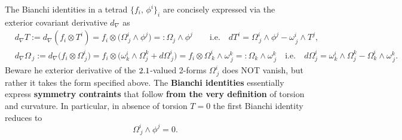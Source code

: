 \begin{mytheorem}
%
The Bianchi identities in a tetrad $\{f_i,\,\phi^i\}_i$ are concisely expressed via the exterior covariant derivative $d_\nabla$ as
{\small\begin{align}
    &d_\nabla T:=d_\nabla(f_i\otimes T^i) = f_i\otimes\big( \Omega^i_{\, j} \wedge \phi^j\big)=:\Omega_j\wedge \phi^j\qquad \text{i.e.}\quad dT^i= \Omega^i_{\, j} \wedge \phi^j - \omega^i_{\, j} \wedge T^j,
    \\
    &d_\nabla\Omega_{\, j}:=d_\nabla\Big(f_i \otimes \Omega^i_{\, j}\Big) = f_i \otimes \Big(\omega_k^i\wedge \Omega^k_j + d \Omega_{\, j}^i\Big) = f_i \otimes \Omega^i_{\, k} \wedge \omega^k_{\, j}=:\Omega_k \wedge \omega^k_{\, j} \quad \text{i.e.}\quad d\Omega^i_j = \omega^i_k\wedge \Omega^k_j - \Omega^i_k \wedge \omega^k_{\, j}.
\end{align}}
Beware he exterior derivative of the $2.1$-valued 2-forms $\Omega^i_{\, j}$ does NOT vanish, but rather it takes the form specified above.
The \textbf{Bianchi identities} essentially express \textbf{symmetry contraints} that follow \textbf{from the very definition} of torsion and curvature.
In particular, in absence of torsion $T=0$ the first Bianchi identity reduces to
\begin{equation}
    \Omega^i_{\, j} \wedge \phi^j = 0.
\end{equation}
\end{mytheorem}
\vspace{-3mm}
